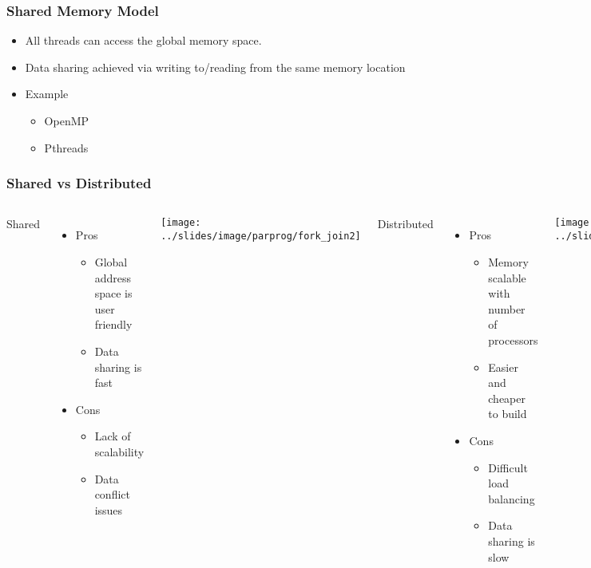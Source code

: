 \documentclass[10pt,t]{beamer}
\begin{document}
\begin{frame}
  \frametitle{Shared Memory Model}
  \begin{itemize}
  \item All threads can access the global memory space.
  \item Data sharing achieved via writing to/reading from the same memory location
  \item Example
    \begin{itemize}
    \item OpenMP
    \item Pthreads
    \end{itemize}
  \end{itemize}
  
\end{frame}

\begin{frame}
  \frametitle{Shared vs Distributed}
  \begin{columns}
    \column{5cm}
    \vspace{-1cm}
    \begin{description}
    \item {Shared}
    \end{description}
    \begin{itemize}
    \item Pros
      \begin{itemize}
      \item Global address space is user friendly
      \item Data sharing is fast
      \end{itemize}
    \item Cons
      \begin{itemize}
      \item Lack of scalability
      \item Data conflict issues
      \end{itemize}
    \end{itemize}
    \texttt{[image: ../slides/image/parprog/fork\_join2]}
    \column{5cm}
    \vspace{-1cm}
    \begin{description}
    \item {Distributed}
    \end{description}
    \begin{itemize}
    \item Pros
      \begin{itemize}
      \item Memory scalable with number of processors
      \item Easier and cheaper to build
      \end{itemize}
    \item Cons
      \begin{itemize}
      \item Difficult load balancing
      \item Data sharing is slow
      \end{itemize}
    \end{itemize}
    \texttt{[image: ../slides/image/parprog/msg\_pass\_model]}
  \end{columns}
\end{frame}
\end{document}
